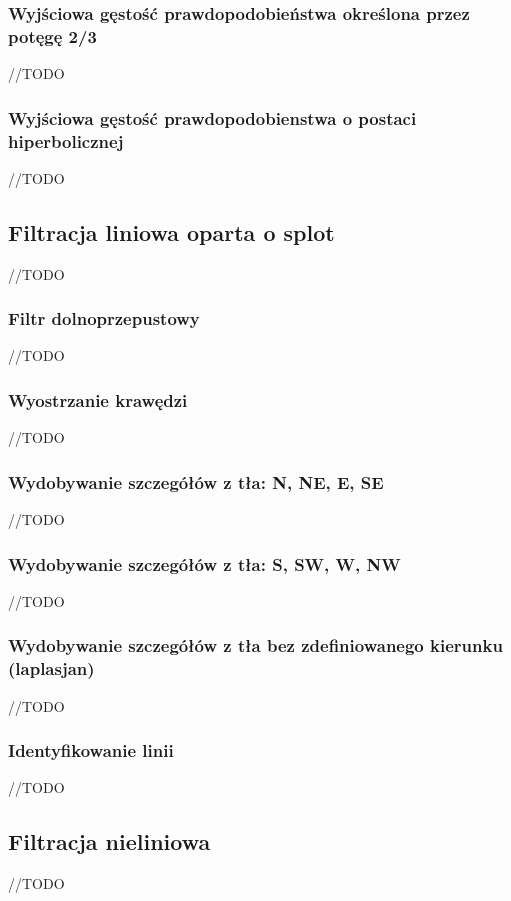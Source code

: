\documentclass{classrep}
\begin{document}
\subsubsection{Wyjściowa gęstość prawdopodobieństwa określona przez potęgę 2/3}
//TODO

\subsubsection{Wyjściowa gęstość prawdopodobienstwa o postaci hiperbolicznej}
//TODO

\subsection{Filtracja liniowa oparta o splot}
//TODO

\subsubsection{Filtr dolnoprzepustowy}
//TODO

\subsubsection{Wyostrzanie krawędzi}
//TODO

\subsubsection{Wydobywanie szczegółów z tła: N, NE, E, SE}
//TODO

\subsubsection{Wydobywanie szczegółów z tła: S, SW, W, NW}
//TODO

\subsubsection{Wydobywanie szczegółów z tła bez zdefiniowanego kierunku (laplasjan)}
//TODO

\subsubsection{Identyfikowanie linii}
//TODO

\subsection{Filtracja nieliniowa}
//TODO
\end{document}
